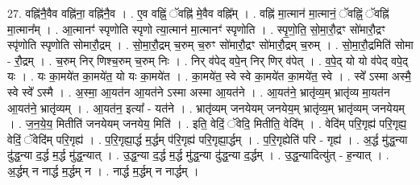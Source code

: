 \documentclass[17pt]{extarticle}
\begin{document}
27. वह्नि॑नै॒वैव वह्नि॑ना॒ वह्नि॑नै॒व । . ए॒व वह्निं॒ ॅवह्नि॑ मे॒वैव वह्नि᳚म् । . वह्नि॑ मा॒त्मान॑ मा॒त्मानं॒ ॅवह्निं॒ ॅवह्नि॑ मा॒त्मान᳚म् । . आ॒त्मानꣳ॑ स्पृणोति स्पृणो त्या॒त्मान॑ मा॒त्मानꣳ॑ स्पृणोति । . स्पृ॒णो॒ति॒ सो॒मा॒रौ॒द्रꣳ सो॑मारौ॒द्रꣳ स्पृ॑णोति स्पृणोति सोमारौ॒द्रम् । . सो॒मा॒रौ॒द्रम् च॒रुम् च॒रुꣳ सो॑मारौ॒द्रꣳ सो॑मारौ॒द्रम् च॒रुम् । . सो॒मा॒रौ॒द्रमिति॑ सोमा - रौ॒द्रम् । . च॒रुम् निर् णिश्च॒रुम् च॒रुम् निः । . निर् व॑पेद् वपे॒न् निर् णिर् व॑पेत् । . व॒पे॒द् यो यो व॑पेद् वपे॒द् यः । . यः का॒मये॑त का॒मये॑त॒ यो यः का॒मये॑त । . का॒मये॑त॒ स्वे स्वे का॒मये॑त का॒मये॑त॒ स्वे । . स्वे᳚ ऽस्मा अस्मै॒ स्वे स्वे᳚ ऽस्मै । . अ॒स्मा॒ आ॒यत॑न आ॒यत॑ने ऽस्मा अस्मा आ॒यत॑ने । . आ॒यत॑ने॒ भ्रातृ॑व्य॒म् भ्रातृ॑व्य मा॒यत॑न आ॒यत॑ने॒ भ्रातृ॑व्यम् । . आ॒यत॑न॒ इत्या᳚ - यत॑ने । . भ्रातृ॑व्यम् जनयेयम् जनयेय॒म् भ्रातृ॑व्य॒म् भ्रातृ॑व्यम् जनयेयम् । . ज॒न॒ये॒य॒ मितीति॑ जनयेयम् जनयेय॒ मिति॑ । . इति॒ वेदिं॒ ॅवेदि॒ मितीति॒ वेदि᳚म् । . वेदि॑म् परि॒गृह्य॑ परि॒गृह्य॒ वेदिं॒ ॅवेदि॑म् परि॒गृह्य॑ । . प॒रि॒गृह्या॒र्द्ध म॒र्द्धम् प॑रि॒गृह्य॑ परि॒गृह्या॒र्द्धम् । . प॒रि॒गृह्येति॑ परि - गृह्य॑ । . अ॒र्द्ध मु॑द्ध॒न्या दु॑द्ध॒न्या द॒र्द्ध म॒र्द्ध मु॑द्ध॒न्यात् । . उ॒द्ध॒न्या द॒र्द्ध म॒र्द्ध मु॑द्ध॒न्या दु॑द्ध॒न्या द॒र्द्धम् । . उ॒द्ध॒न्यादित्यु॑त् - ह॒न्यात् । . अ॒र्द्धम् न नार्द्ध म॒र्द्धम् न । . नार्द्ध म॒र्द्धम् न नार्द्धम् । \newline
\end{document}

